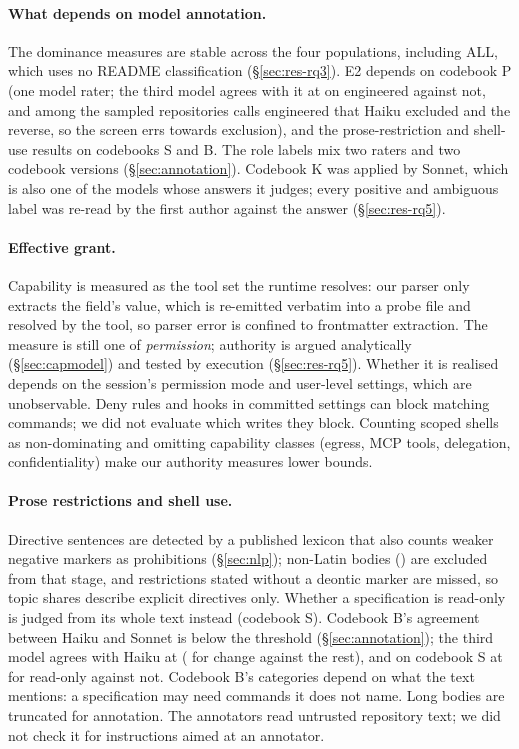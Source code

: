 \paragraph{What depends on model annotation.} The dominance measures are stable across the four populations,
including ALL, which uses no README classification (\S\ref{sec:res-rq3}). E2 depends on codebook P (one model rater; the third model agrees with it at
\alphaOpusEngHaiku{} on engineered against not, and among the \nEngKit{} sampled repositories calls \nEngOpusOnly{}
engineered that Haiku excluded and \nEngHaikuOnly{} the reverse, so the screen errs towards exclusion),
and the prose-restriction and shell-use results on codebooks S and B. The role labels mix two raters and two codebook
versions (\S\ref{sec:annotation}). Codebook K was applied
by Sonnet, which is also one of the models whose answers it judges; every positive and ambiguous label was re-read by the first author
against the answer (\S\ref{sec:res-rq5}).

\paragraph{Effective grant.} Capability is measured as the tool set the runtime resolves: our parser only extracts the
field's value, which is re-emitted verbatim into a probe file and resolved by the tool, so parser error is confined to
frontmatter extraction. The measure is still one of \emph{permission}; authority is argued analytically
(\S\ref{sec:capmodel}) and tested by execution (\S\ref{sec:res-rq5}). Whether it is realised depends on the
session's permission mode and user-level settings, which are unobservable. Deny rules and hooks in committed settings
can block matching commands; we did not evaluate which writes they block. Counting scoped shells as non-dominating
and omitting capability classes (egress, MCP tools, delegation, confidentiality) make our authority measures lower
bounds.

\paragraph{Prose restrictions and shell use.} Directive sentences are detected by a published lexicon that also counts
weaker negative markers as prohibitions (\S\ref{sec:nlp}); non-Latin bodies (\pctNonLatin{}) are excluded from that
stage, and restrictions stated without a deontic marker are missed, so topic shares describe explicit directives only.
Whether a specification is read-only is judged from its whole text instead (codebook S). Codebook B's agreement
between Haiku and Sonnet is below the threshold (\S\ref{sec:annotation}); the third model agrees with Haiku at
\alphaOpusShellHaiku{} (\alphaOpusShellChangeHaiku{} for change against the rest), and on codebook S at
\alphaOpusRestrHaiku{} for read-only against not. Codebook B's categories depend on what the text
mentions: a specification may need commands it does not name. Long bodies are truncated for annotation. The
annotators read untrusted repository text; we did not check it for instructions aimed at an annotator.

